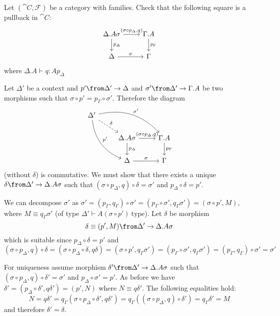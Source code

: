 \begin{exercise}
  Let $(\cat C, \mathcal F)$ be a category with families.  Check that the
  following square is a pullback in $\cat{C}$:
  \[
    \begin{tikzcd}
      \Delta.A\sigma \arrow{r}{(\sigma \circ p_\Delta, q)} \arrow{d}{p_\Delta} & \Gamma.A \arrow{d}{p_\Gamma}\\
      \Delta \arrow{r}{\sigma} & \Gamma
    \end{tikzcd}
  \]
  where $\Delta.A \vdash q : A p_\Delta$
\end{exercise}
\begin{answer}
  Let $\Delta'$ be a context and $p' \from \Delta' \to \Delta$ and $\sigma'
  \from \Delta' \to \Gamma.A$ be two morphisms such that $\sigma \circ p' =
  p_\Gamma \circ \sigma'$. Therefore the diagram
  \[
    \begin{tikzcd}
      \Delta' \arrow[bend right=30]{ddr}{p'} \arrow[dashed]{dr}{\delta} \arrow[bend left=30]{drr}{\sigma'}&   &\\
          & \Delta.A\sigma \arrow{r}{(\sigma \circ p_\Delta, q)} \arrow{d}{p_\Delta} & \Gamma.A \arrow{d}{p_\Gamma}\\
          & \Delta \arrow{r}{\sigma} & \Gamma
    \end{tikzcd}
  \]
  (without $\delta$) is commutative. We must show that there exists a unique
  $\delta \from \Delta' \to \Delta.A\sigma$ such that $(\sigma \circ p_\Delta,
  q) \circ \delta = \sigma'$ and $p_\Delta \circ \delta = p'$.

  We can decompose $\sigma'$ as $\sigma' = (p_\Gamma, q_\Gamma) \circ \sigma' =
  (p_\Gamma \circ \sigma', q_\Gamma\sigma') = (\sigma \circ p', M)$, where $M
  \equiv q_\Gamma\sigma'$ (of type $\Delta' \vdash A(\sigma \circ p')
  ~\text{type}$). Let $\delta$ be morphism
  \[
    \delta \equiv (p', M) \from \Delta' \to \Delta.A\sigma
  \]
  which is suitable since $p_\Delta \circ \delta = p'$ and
  \[
    (\sigma \circ p_\Delta, q) \circ \delta =
    (\sigma \circ p_\Delta \circ \delta, q\delta) =
    (\sigma \circ p', q_\Gamma\sigma') =
    (p_\Gamma \circ \sigma', q_\Gamma\sigma') =
    (p_\Gamma, q_\Gamma) \circ \sigma' =
    \sigma'
  \]

  For uniqueness assume morphism $\delta' \from \Delta' \to \Delta.A\sigma$
  such that $(\sigma \circ p_\Delta, q) \circ \delta' = \sigma'$ and $p_\Delta
  \circ \sigma' = p'$. As before we have $\delta' = (p_\Delta \circ \delta',
  q\delta') = (p', N)$ where $N \equiv q\delta'$. The following equalities
  hold:
  \[
    N = q\delta' = q_\Gamma(\sigma \circ p_\Delta \circ \delta', q\delta') = q_\Gamma((\sigma \circ p_\Delta, q) \circ \delta') = q_\Gamma\delta' = M
  \]
  and therefore $\delta' = \delta$.
\end{answer}

